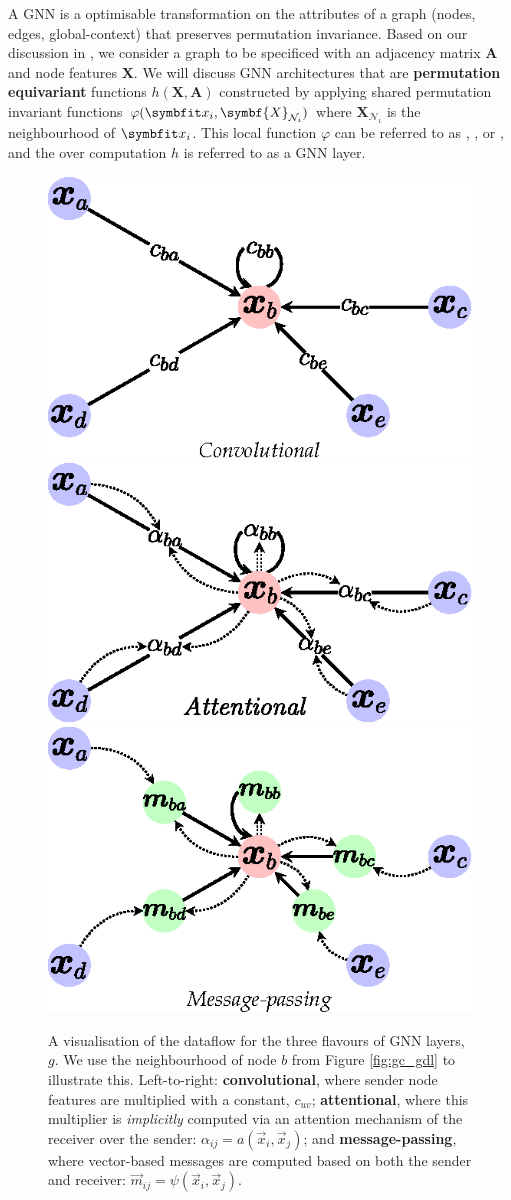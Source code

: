 A GNN is a optimisable transformation on the attributes of a graph (nodes, edges, global-context) that preserves permutation invariance.
Based on our discussion in , we consider a graph to be specificed with an adjacency matrix $\symbf{A}$ and node features $\symbf{X}$. We will discuss GNN architectures that are \textbf{permutation equivariant} functions $h(\symbf{X}, \symbf{A})$ constructed by applying shared permutation invariant functions $\varphi(\bfitx_i, \symbf{X}_{\mathcal{N}_i})$ where $\symbf{X}_{\mathcal{N}_i}$ is the neighbourhood of $\bfitx_i$. This local function $\varphi$ can be referred to as , , or , and the over computation $h$ is referred to as a GNN layer.

\begin{figure}
    \centering
    \includegraphics[width=0.33\linewidth]{chapters/assets/graph-figs/GNN_GDL_TYPES_C.eps}
    \hspace{-0.5em}
    \includegraphics[width=0.33\linewidth]{chapters/assets/graph-figs/GNN_GDL_TYPES_A.eps}
    \hspace{-0.5em}
    \includegraphics[width=0.33\linewidth]{chapters/assets/graph-figs/GNN_GDL_TYPES_MP.eps}
    \caption{A visualisation of the dataflow for the three flavours of GNN layers, $g$. We use the neighbourhood of node $b$ from Figure \ref{fig:gc_gdl} to illustrate this. Left-to-right: \textbf{convolutional}, where sender node features are multiplied with a constant, $c_{uv}$; \textbf{attentional}, where this multiplier is \emph{implicitly} computed via an attention mechanism of the receiver over the sender: $\alpha_{ij}=a(\vec{x}_i, \vec{x}_j)$; and \textbf{message-passing}, where vector-based messages are computed based on both the sender and receiver: $\vec{m}_{ij}=\psi(\vec{x}_i, \vec{x}_j)$.}
    \label{fig:gc_flavours}
\end{figure}%

